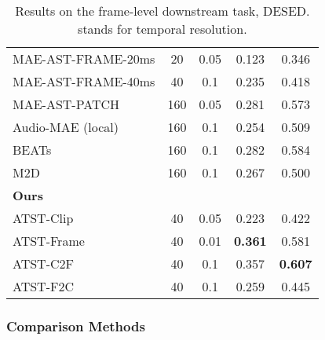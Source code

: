 \begin{table}[h]
{\begin{threeparttable}
\begin{tabular}{lcccc}
        MAE-AST-FRAME-20ms \cite{baade_mae-ast_2022} & 20 & 0.05 & 0.123 & 0.346 \\
        MAE-AST-FRAME-40ms \cite{baade_mae-ast_2022} & 40 & 0.1 & 0.235 & 0.418 \\
        MAE-AST-PATCH   \cite{baade_mae-ast_2022}    & 160 & 0.05 & 0.281 & 0.573 \\
        Audio-MAE (local) \cite{huang_masked_2023}   & 160 & 0.1 & 0.254 & 0.509 \\
        BEATs \cite{chen_beats_2022}       & 160 & 0.1 & 0.282 & 0.584 \\
        M2D \cite{niizumi_masked_2023}               & 160 & 0.1 & 0.267 & 0.500 \\
        \midrule
        \multicolumn{5}{l}{\textbf{Ours}} \\
        ATST-Clip                          & 40 & 0.05 & 0.223 & 0.422      \\
        ATST-Frame                         & 40 & 0.01 & \textbf{0.361} & 0.581 \\
        ATST-C2F                         & 40 & 0.1 & 0.357 & \textbf{0.607}  \\
        \textcolor{mygray}{ATST-F2C}                         & \textcolor{mygray}{40} & \textcolor{mygray}{0.1} & \textcolor{mygray}{0.259} & \textcolor{mygray}{0.445} \\
        \bottomrule
        \end{tabular}     
    \end{threeparttable}
  }
  \caption{Results on the frame-level downstream task, DESED.  {} stands for temporal resolution.}
  \label{tab:linear_SED}
\end{table}










\subsubsection{Comparison Methods}

